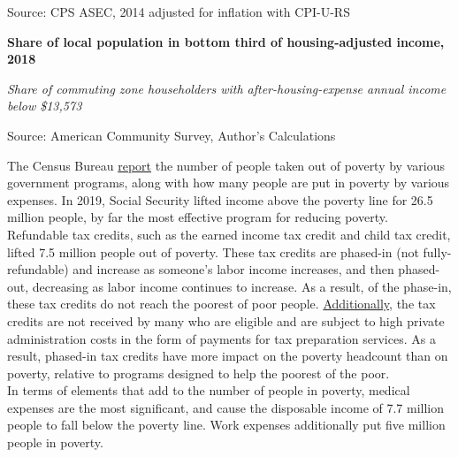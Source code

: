 \documentclass{report}
\newcommand{\tbllink}[1]{\href{https://raw.githubusercontent.com/bdecon/US-chartbook/master/chartbook/data/#1}{\faTable}}
\begin{document}
{{{\begin{minipage}{0.76\textwidth}
\footnotesize{Source: CPS ASEC, 2014 adjusted for inflation with CPI-U-RS} \hfill \tbllink{poor_age_latest.csv}

\end{minipage}

\vspace{7mm}

\normalsize \textbf{Share of local population in bottom third of housing-adjusted income, 2018}
\vspace{-2mm}

\footnotesize{\textit{Share of commuting zone householders with after-housing-expense annual income below \$13,573}}

\vspace{-1mm}
\hspace{-15mm} 

\vspace{-5mm}
\footnotesize{Source: American Community Survey, Author's Calculations}

\newpage
\begin{minipage}{0.76\textwidth}
\small The Census Bureau \href{https://www.census.gov/library/publications/2020/demo/p60-272.html}{report} the number of people taken out of poverty by various government programs, along with how many people are put in poverty by various expenses. In 2019, Social Security lifted income above the poverty line for 26.5 million people, by far the most effective program for reducing poverty.\\

Refundable tax credits, such as the earned income tax credit and child tax credit, lifted 7.5 million people out of poverty. These tax credits are phased-in (not fully-refundable) and increase as someone's labor income increases, and then phased-out, decreasing as labor income continues to increase. As a result, of the phase-in, these tax credits do not reach the poorest of poor people. \href{https://www.peoplespolicyproject.org/2020/05/18/the-myths-of-the-earned-income-tax-credit/}{Additionally}, the tax credits are not received by many who are eligible and are subject to high private administration costs in the form of payments for tax preparation services. As a result, phased-in tax credits have more impact on the poverty headcount than on poverty, relative to programs designed to help the poorest of the poor.\\

In terms of elements that add to the number of people in poverty, medical expenses are the most significant, and cause the disposable income of 7.7 million people to fall below the poverty line. Work expenses additionally put five million people in poverty.


\end{minipage}}}}
\end{document}
